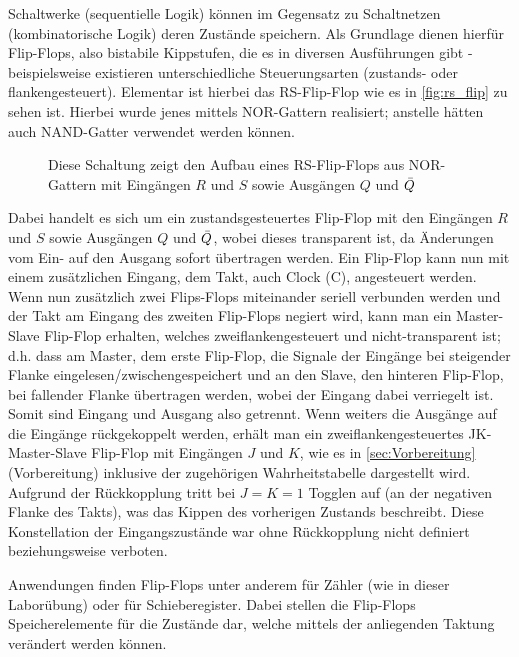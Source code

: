 Schaltwerke (sequentielle Logik) können im Gegensatz zu 
Schaltnetzen (kombinatorische Logik) deren Zustände
speichern. Als Grundlage dienen hierfür Flip-Flops,
also bistabile Kippstufen, die es in diversen
Ausführungen gibt - beispielsweise existieren unterschiedliche
Steuerungsarten (zustands- oder flankengesteuert). 
Elementar ist hierbei das RS-Flip-Flop wie es in
\autoref{fig:rs_flip} zu sehen ist. Hierbei wurde jenes
mittels NOR-Gattern realisiert; anstelle hätten auch
NAND-Gatter verwendet werden können.
\begin{figure}[H]
  \centering
    \caption{Diese Schaltung zeigt den Aufbau eines
    RS-Flip-Flops aus NOR-Gattern mit Eingängen $R$ und
    $S$ sowie Ausgängen $Q$ und $\Bar{Q}$ \cite{tietze}
  }
  \label{fig:rs_flip}
\end{figure}
Dabei handelt es sich um ein zustandsgesteuertes
Flip-Flop mit den Eingängen $R$ und $S$ sowie
Ausgängen $Q$ und $\Bar{Q}$, wobei dieses
transparent ist, da Änderungen vom Ein- auf den
Ausgang sofort übertragen werden.
Ein Flip-Flop kann nun mit einem zusätzlichen
Eingang, dem Takt, auch Clock (C),
angesteuert werden. Wenn nun zusätzlich zwei Flips-Flops miteinander
seriell verbunden werden und der Takt am Eingang des zweiten Flip-Flops 
negiert wird, kann man ein Master-Slave Flip-Flop erhalten, welches
zweiflankengesteuert und nicht-transparent ist; d.h. dass am Master, dem erste Flip-Flop, die
Signale der Eingänge bei steigender Flanke eingelesen/zwischengespeichert
und an den Slave, den hinteren Flip-Flop, bei fallender Flanke
übertragen werden, wobei der Eingang dabei verriegelt ist.
Somit sind Eingang und Ausgang also getrennt.
Wenn weiters die Ausgänge auf die Eingänge rückgekoppelt
werden, erhält man ein zweiflankengesteuertes JK-Master-Slave
Flip-Flop mit Eingängen $J$ und $K$, wie es in \autoref{sec:Vorbereitung} 
(Vorbereitung) inklusive
der zugehörigen Wahrheitstabelle dargestellt wird. Aufgrund
der Rückkopplung tritt bei $J=K=1$  Togglen auf (an der negativen Flanke des Takts),
was das Kippen des vorherigen Zustands beschreibt. Diese Konstellation der
Eingangszustände war ohne Rückkopplung nicht definiert beziehungsweise verboten.

Anwendungen finden Flip-Flops unter anderem für Zähler (wie in dieser
Laborübung) oder für Schieberegister. Dabei stellen die Flip-Flops
Speicherelemente für die Zustände dar, welche mittels der
anliegenden Taktung
verändert werden können. 
